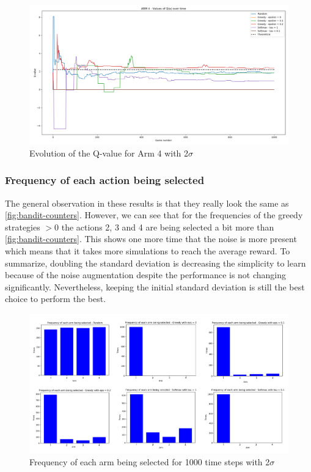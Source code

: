 \documentclass{article}
\begin{document}
\begin{figure}[H]
  \centering
  \includegraphics[scale=0.34]{fig/bandit2-arm4.png}
  \caption{Evolution of the Q-value for Arm 4 with 2$\sigma$}
  \label{fig:bandit2-arm4}
\end{figure}

\subsubsection{Frequency of each action being selected}
The general observation in these results is that they really look the same as \autoref{fig:bandit-counters}. However, we can see that for the frequencies of the greedy strategies $> 0$ the actions 2, 3 and 4 are being selected a bit more than \autoref{fig:bandit-counters}. This shows one more time that the noise is more present which means that it takes more simulations to reach the average reward. To summarize, doubling the standard deviation is decreasing the simplicity to learn because of the noise augmentation despite the performance is not changing significantly. Nevertheless, keeping the initial standard deviation is still the best choice to perform the best.    

\begin{figure}[H]
  \centering
  \includegraphics[scale=1]{fig/bandit2-counters.png}
  \caption{Frequency of each arm being selected for 1000 time steps with 2$\sigma$}
  \label{fig:bandit2-counters}
\end{figure}
\end{document}
